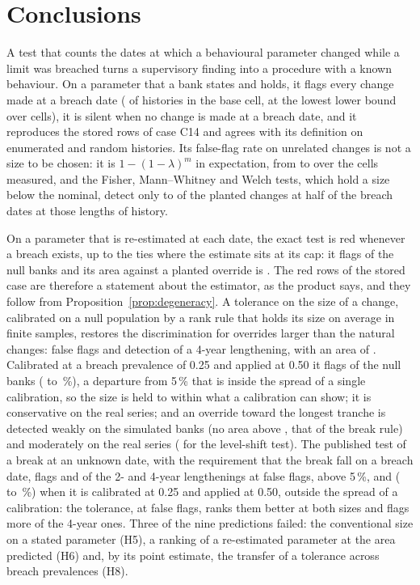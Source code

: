 \section{Conclusions}
\label{sec:conclusions}

A test that counts the dates at which a behavioural parameter changed while a limit was breached turns a supervisory finding into a procedure with a known behaviour. On a parameter that a bank states and holds, it flags every change made at a breach date (\statedAltEngine{} of \statedN{} histories in the base cell, \statedAltMinLo{} at the lowest lower bound over \statedCells{} cells), it is silent when no change is made at a breach date, and it reproduces the stored rows of case C14 and agrees with its definition on \gridTotal{} enumerated and \randomN{} random histories. Its false-flag rate on unrelated changes is not a size to be chosen: it is $1-(1-\lambda)^m$ in expectation, from \statedNullMin{} to \statedNullMax{} over the cells measured, and the Fisher, Mann--Whitney and Welch tests, which hold a size below the nominal, detect only \opTestsMin{} to \opTestsMax{} of the planted changes at half of the breach dates at those lengths of history.

On a parameter that is re-estimated at each date, the exact test is red whenever a breach exists, up to the ties where the estimate sits at its cap: it flags \fitNullEngine{} of the null banks and its area against a planted override is \fitAucCEngine{}. The red rows of the stored case are therefore a statement about the estimator, as the product says, and they follow from Proposition~\ref{prop:degeneracy}. A tolerance on the size of a change, calibrated on a null population by a rank rule that holds its size on average in finite samples, restores the discrimination for overrides larger than the natural changes: \fitNullTol{} false flags and \fitAddDTol{} detection of a 4-year lengthening, with an area of \fitAucDTol{}. Calibrated at a breach prevalence of 0.25 and applied at 0.50 it flags \fitMisCTol{} of the null banks (\fitMisCTolLo{} to \fitMisCTolHi{}\,\%), a departure from 5\,\% that is inside the spread of a single calibration, so the size is held to within what a calibration can show; it is conservative on the real series; and an override toward the longest tranche is detected weakly on the simulated banks (no area above \wTopAuc{}, that of the break rule) and moderately on the real series (\wRealTopAuc{} for the level-shift test). The published test of a break at an unknown date, with the requirement that the break fall on a breach date, flags \fitAddCShiftB{} and \fitAddDShiftB{} of the 2- and 4-year lengthenings at \fitNullShiftB{} false flags, above 5\,\%, and \fitMisCShiftB{} (\fitMisCShiftBLo{} to \fitMisCShiftBHi{}\,\%) when it is calibrated at 0.25 and applied at 0.50, outside the spread of a calibration: the tolerance, at \fitNullTol{} false flags, ranks them better at both sizes and flags more of the 4-year ones. Three of the nine predictions failed: the conventional size on a stated parameter (H5), a ranking of a re-estimated parameter at the area predicted (H6) and, by its point estimate, the transfer of a tolerance across breach prevalences (H8).

